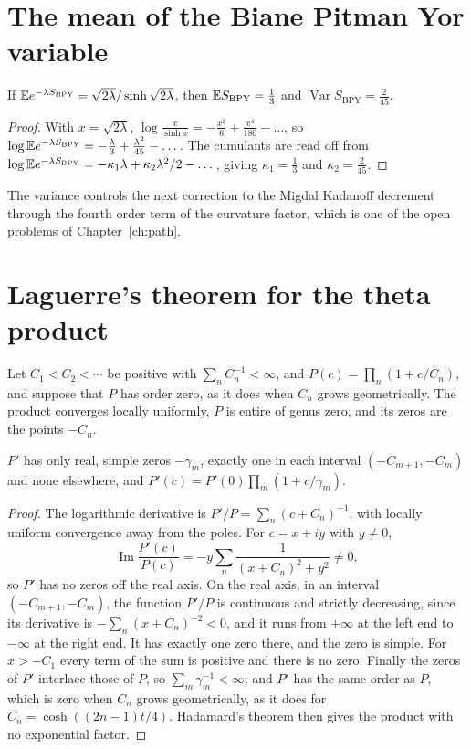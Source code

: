 \section{The mean of the Biane Pitman Yor variable}

\begin{proposition}
If $\mathbb{E} e^{-\lambda S_{\mathrm{BPY}}}=\sqrt{2\lambda}/\sinh\sqrt{2\lambda}$, then $\mathbb{E} S_{\mathrm{BPY}}=\frac13$ and $\operatorname{Var}S_{\mathrm{BPY}}=\frac{2}{45}$.
\end{proposition}

\begin{proof}
With $x=\sqrt{2\lambda}$, $\log\frac{x}{\sinh x}=-\frac{x^2}{6}+\frac{x^4}{180}-\dots$, so $\log\mathbb{E} e^{-\lambda S_{\mathrm{BPY}}}=-\frac\lambda3+\frac{\lambda^2}{45}-\dots$. The cumulants are read off from $\log\mathbb{E} e^{-\lambda S_{\mathrm{BPY}}}=-\kappa_1\lambda+\kappa_2\lambda^2/2-\dots$, giving $\kappa_1=\frac13$ and $\kappa_2=\frac{2}{45}$.
\end{proof}

The variance controls the next correction to the Migdal Kadanoff decrement through the fourth order term of the curvature factor, which is one of the open problems of Chapter~\ref{ch:path}.

\section{Laguerre's theorem for the theta product}

Let $C_1<C_2<\cdots$ be positive with $\sum_nC_n^{-1}<\infty$, and $P(c)=\prod_n(1+c/C_n)$, and suppose that $P$ has order zero, as it does when $C_n$ grows geometrically. The product converges locally uniformly, $P$ is entire of genus zero, and its zeros are the points $-C_n$.

\begin{proposition}
$P'$ has only real, simple zeros $-\gamma_m$, exactly one in each interval $(-C_{m+1},-C_m)$ and none elsewhere, and $P'(c)=P'(0)\prod_m(1+c/\gamma_m)$.
\end{proposition}

\begin{proof}
The logarithmic derivative is $P'/P=\sum_n(c+C_n)^{-1}$, with locally uniform convergence away from the poles. For $c=x+iy$ with $y\ne0$,
\[
\operatorname{Im}\frac{P'(c)}{P(c)}=-y\sum_n\frac{1}{(x+C_n)^2+y^2}\ne0,
\]
so $P'$ has no zeros off the real axis. On the real axis, in an interval $(-C_{m+1},-C_m)$, the function $P'/P$ is continuous and strictly decreasing, since its derivative is $-\sum_n(x+C_n)^{-2}<0$, and it runs from $+\infty$ at the left end to $-\infty$ at the right end. It has exactly one zero there, and the zero is simple. For $x>-C_1$ every term of the sum is positive and there is no zero. Finally the zeros of $P'$ interlace those of $P$, so $\sum_m\gamma_m^{-1}<\infty$; and $P'$ has the same order as $P$, which is zero when $C_n$ grows geometrically, as it does for $C_n=\cosh((2n-1)t/4)$. Hadamard's theorem then gives the product with no exponential factor.
\end{proof}

